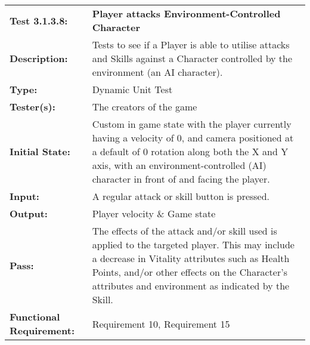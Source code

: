 \documentclass[12pt, titlepage]{article}
\begin{document}
\begin{mdframed}[linewidth=1pt]
\begin{tabularx}{\textwidth}{@{}p{3cm}X@{}}
{\bf Test 3.1.3.8:} & {\bf Player attacks Environment-Controlled Character}\\[\baselineskip]
{\bf Description:} & Tests to see if a Player is able to utilise attacks and Skills against a Character controlled by the environment (an AI character). \\[0.5\baselineskip]
{\bf Type:} & Dynamic Unit Test\\[0.5\baselineskip]
{\bf Tester(s):} & The creators of the game\\[0.5\baselineskip]
{\bf Initial State:} & Custom in game state with the player currently having a velocity of 0, and camera positioned at a default of 0 rotation along both the X and Y axis, with an environment-controlled (AI) character in front of and facing the player. \\[0.5\baselineskip]
{\bf Input:} & A regular attack or skill button is pressed. \\[0.5\baselineskip]
{\bf Output:} & Player velocity \& Game state\\[0.5\baselineskip]
{\bf Pass:} & The effects of the attack and/or skill used is applied to the targeted player. This may include a decrease in Vitality attributes such as Health Points, and/or other effects on the Character's attributes and environment as indicated by the Skill. \\[0.5\baselineskip]
{\bf Functional Requirement:} & Requirement 10, Requirement 15
\end{tabularx}
\end{mdframed}
\end{document}
